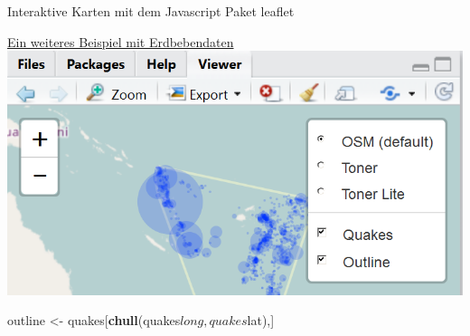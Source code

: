 \documentclass[ignorenonframetext,]{beamer}
\newenvironment{Shaded}{}{}
\newcommand{\KeywordTok}[1]{\textcolor[rgb]{0.00,0.44,0.13}{\textbf{{#1}}}}
\newcommand{\StringTok}[1]{\textcolor[rgb]{0.25,0.44,0.63}{{#1}}}
\newcommand{\NormalTok}[1]{{#1}}
\begin{document}
\begin{frame}[fragile]{Interaktive Karten mit dem Javascript Paket
leaflet}
\begin{block}{\href{https://rstudio.github.io/leaflet/showhide.html}{Ein
weiteres Beispiel mit Erdbebendaten}}
\includegraphics{./tex2pdf.9796/1e0bb66d5996be9e18cf42ff8105ba02512af5cc.png}

\begin{Shaded}
\begin{Highlighting}[]
\NormalTok{outline <-}\StringTok{ }\NormalTok{quakes[}\KeywordTok{chull}\NormalTok{(quakes$long, quakes$lat),]}
\end{Highlighting}
\end{Shaded}


\end{block}
\end{frame}
\end{document}
